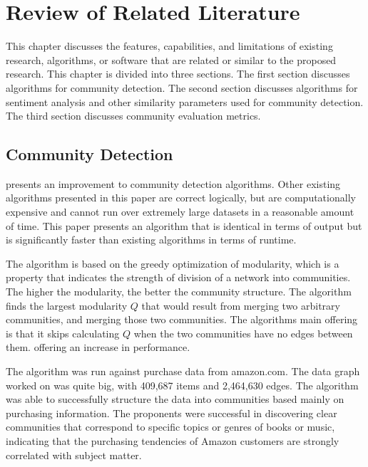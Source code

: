 %
%
%                 

\chapter{Review of Related Literature}
\label{sec:relatedlit}

This chapter discusses the features, capabilities, and limitations of existing research, algorithms, or software that are related or similar to the proposed research. This chapter is divided into three sections. The first section discusses algorithms for community detection. The second section discusses algorithms for sentiment analysis and other similarity parameters used for community detection. The third section discusses community evaluation metrics.

\section{Community Detection}

 presents an improvement to community detection algorithms. Other existing algorithms presented in this paper are correct logically, but are computationally expensive and cannot run over extremely large datasets in a reasonable amount of time. This paper presents an algorithm that is identical in terms of output but is significantly faster than existing algorithms in terms of runtime.

The algorithm is based on the greedy optimization of modularity, which is a property that indicates the strength of division of a network into communities. The higher the modularity, the better the community structure. 
The algorithm finds the largest modularity $Q$ that would result from merging two arbitrary communities, and merging those two communities. The algorithm\vtick s main offering is that it skips calculating $Q$ when the two communities have no edges between them. offering an increase in performance. 

The algorithm was run against purchase data from amazon.com. The data graph worked on was quite big, with 409,687 items and 2,464,630 edges. The algorithm was able to successfully structure the data into communities based mainly on purchasing information. The proponents were successful in discovering clear communities that correspond to specific topics or genres of books or music, indicating that the purchasing tendencies of Amazon customers are strongly correlated with subject matter.

